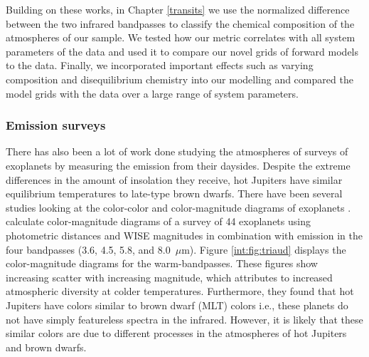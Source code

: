 Building on these works, in Chapter \ref{transits} we use the normalized difference between the two \spitzer infrared bandpasses to classify the chemical composition of the atmospheres of our sample. We tested how our metric correlates with all system parameters of the data and used it to compare our novel grids of forward models to the data. Finally, we incorporated important effects such as varying composition and disequilibrium chemistry into our modelling and compared the model grids with the data over a large range of system parameters.

\subsubsection{Emission surveys}

There has also been a lot of work done studying the atmospheres of surveys of exoplanets by measuring the emission from their daysides. Despite the extreme differences in the amount of insolation they receive, hot Jupiters have similar equilibrium temperatures to late-type brown dwarfs. There have been several studies looking at the color-color and color-magnitude diagrams of exoplanets \citep{Triaud2014a, Triaud2014c, Dransfield2020, Melville2020}. \citet{Triaud2014c} calculate color-magnitude diagrams of a survey of 44 exoplanets using photometric distances and WISE magnitudes in combination with \spitzer emission in the four bandpasses (3.6, 4.5, 5.8, and 8.0~$\mu$m). Figure \ref{int:fig:triaud} displays the color-magnitude diagrams for the warm-\spitzer bandpasses. These figures show increasing scatter with increasing magnitude, which \citet{Triaud2014c} attributes to increased atmospheric diversity at colder temperatures. Furthermore, they found that hot Jupiters have colors similar to brown dwarf (MLT) colors i.e., these planets do not have simply featureless spectra in the infrared. However, it is likely that these similar colors are due to different processes in the atmospheres of hot Jupiters and brown dwarfs.


